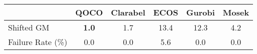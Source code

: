 \begin{tabular}{lccccc}
  \hline
   & \textbf{QOCO} & \textbf{Clarabel} & \textbf{ECOS} & \textbf{Gurobi} & \textbf{Mosek} \\ \hline
  Shifted GM & \textbf{1.0} & 1.7 & 13.4 & 12.3 & 4.2 \\ 
  Failure Rate (\%) & 0.0 & 0.0 & 5.6 & 0.0 & 0.0 \\ \hline 
\end{tabular}
